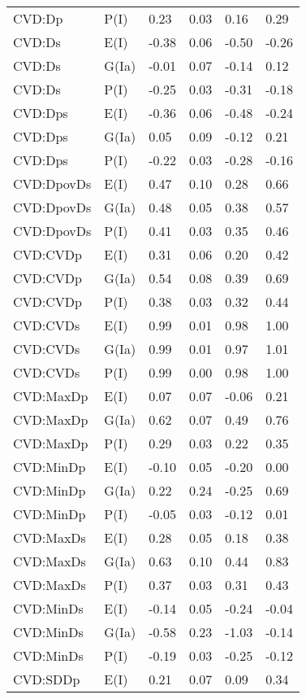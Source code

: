 \begin{center}
\begin{longtable}{|p{1.1in}|p{0.7in}|p{0.7in}|p{0.6in}|p{0.6in}|p{0.6in}|}
  CVD:Dp & P(I) & 0.23 & 0.03 & 0.16 & 0.29 \\ 
  CVD:Ds & E(I) & -0.38 & 0.06 & -0.50 & -0.26 \\ 
  CVD:Ds & G(Ia) & -0.01 & 0.07 & -0.14 & 0.12 \\ 
  CVD:Ds & P(I) & -0.25 & 0.03 & -0.31 & -0.18 \\ 
  CVD:Dps & E(I) & -0.36 & 0.06 & -0.48 & -0.24 \\ 
  CVD:Dps & G(Ia) & 0.05 & 0.09 & -0.12 & 0.21 \\ 
  CVD:Dps & P(I) & -0.22 & 0.03 & -0.28 & -0.16 \\ 
  CVD:DpovDs & E(I) & 0.47 & 0.10 & 0.28 & 0.66 \\ 
  CVD:DpovDs & G(Ia) & 0.48 & 0.05 & 0.38 & 0.57 \\ 
  CVD:DpovDs & P(I) & 0.41 & 0.03 & 0.35 & 0.46 \\ 
  CVD:CVDp & E(I) & 0.31 & 0.06 & 0.20 & 0.42 \\ 
  CVD:CVDp & G(Ia) & 0.54 & 0.08 & 0.39 & 0.69 \\ 
  CVD:CVDp & P(I) & 0.38 & 0.03 & 0.32 & 0.44 \\ 
  CVD:CVDs & E(I) & 0.99 & 0.01 & 0.98 & 1.00 \\ 
  CVD:CVDs & G(Ia) & 0.99 & 0.01 & 0.97 & 1.01 \\ 
  CVD:CVDs & P(I) & 0.99 & 0.00 & 0.98 & 1.00 \\ 
  CVD:MaxDp & E(I) & 0.07 & 0.07 & -0.06 & 0.21 \\ 
  CVD:MaxDp & G(Ia) & 0.62 & 0.07 & 0.49 & 0.76 \\ 
  CVD:MaxDp & P(I) & 0.29 & 0.03 & 0.22 & 0.35 \\ 
  CVD:MinDp & E(I) & -0.10 & 0.05 & -0.20 & 0.00 \\ 
  CVD:MinDp & G(Ia) & 0.22 & 0.24 & -0.25 & 0.69 \\ 
  CVD:MinDp & P(I) & -0.05 & 0.03 & -0.12 & 0.01 \\ 
  CVD:MaxDs & E(I) & 0.28 & 0.05 & 0.18 & 0.38 \\ 
  CVD:MaxDs & G(Ia) & 0.63 & 0.10 & 0.44 & 0.83 \\ 
  CVD:MaxDs & P(I) & 0.37 & 0.03 & 0.31 & 0.43 \\ 
  CVD:MinDs & E(I) & -0.14 & 0.05 & -0.24 & -0.04 \\ 
  CVD:MinDs & G(Ia) & -0.58 & 0.23 & -1.03 & -0.14 \\ 
  CVD:MinDs & P(I) & -0.19 & 0.03 & -0.25 & -0.12 \\ 
  CVD:SDDp & E(I) & 0.21 & 0.07 & 0.09 & 0.34 \\ 

\end{longtable}
\end{center}
